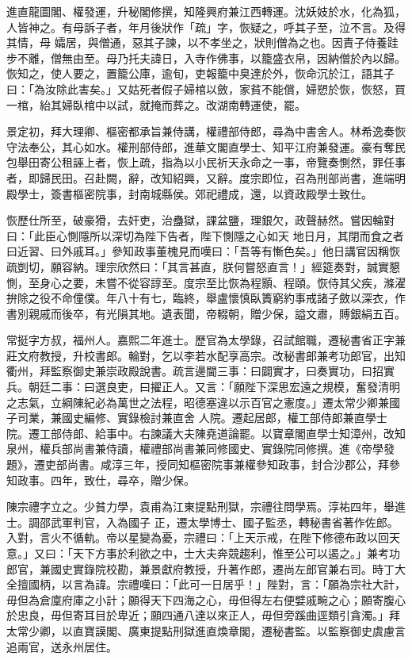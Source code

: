 \begin{pinyinscope}
 進直龍圖閣、權發運，升秘閣修撰，知隆興府兼江西轉運。沈妖妓於水，化為狐，人皆神之。有母訴子者，年月後狀作「疏」字，恢疑之，呼其子至，泣不言。及得其情，母
 孀居，與僧通，惡其子諫，以不孝坐之，狀則僧為之也。因責子侍養跬步不離，僧無由至。母乃托夫諱日，入寺作佛事，以籠盛衣帛，因納僧於內以歸。恢知之，使人要之，置籠公庫，逾旬，吏報籠中臭達於外，恢命沉於江，語其子曰：「為汝除此害矣。」又姑死者假子婦棺以斂，家貧不能償，婦愬於恢，恢怒，買一棺，紿其婦臥棺中以試，就掩而葬之。改湖南轉運使，罷。



 景定初，拜大理卿、樞密都承旨兼侍講，權禮部侍郎，尋為中書舍人。林希逸奏恢
 守法奉公，其心如水。權刑部侍郎，進華文閣直學士、知平江府兼發運。豪有奪民包舉田寄公租誣上者，恢上疏，指為以小民祈天永命之一事，帝覽奏惻然，罪任事者，即歸民田。召赴闕，辭，改知紹興，又辭。度宗即位，召為刑部尚書，進端明殿學士，簽書樞密院事，封南城縣侯。郊祀禮成，還，以資政殿學士致仕。



 恢歷仕所至，破豪猾，去奸吏，治蠱獄，課盆鹽，理銀欠，政聲赫然。嘗因輪對曰：「此臣心惻隱所以深切為陛下告者，陛下惻隱之心如天
 地日月，其閉而食之者曰近習、曰外戚耳。」參知政事董槐見而嘆曰：「吾等有慚色矣。」他日講官因稱恢疏剴切，願容納。理宗欣然曰：「其言甚直，朕何嘗怒直言！」經筵奏對，誠實懇惻，至身心之要，未嘗不從容諄至。度宗至比恢為程顥、程頤。恢侍其父疾，滌濯拚除之役不命僮僕。年八十有七，臨終，舉盧懷慎臥簀窮約事戒諸子斂以深衣，作書別親戚而後卒，有光隕其地。遺表聞，帝輟朝，贈少保，謚文肅，賻銀絹五百。



 常挺字方叔，福州人。嘉熙二年進士。歷官為太學錄，召試館職，遷秘書省正字兼莊文府教授，升校書郎。輪對，乞以李若水配享高宗。改秘書郎兼考功郎官，出知衢州，拜監察御史兼崇政殿說書。疏言邊閫三事：曰闢實才，曰奏實功，曰招實兵。朝廷二事：曰選良吏，曰擢正人。又言：「願陛下深思宏遠之規模，奮發清明之志氣，立綱陳紀必為萬世之法程，昭德塞違以示百官之憲度。」遷太常少卿兼國子司業，兼國史編修、實錄檢討兼直舍
 人院。遷起居郎，權工部侍郎兼直學士院。遷工部侍郎、給事中。右諫議大夫陳堯道論罷。以寶章閣直學士知漳州，改知泉州，權兵部尚書兼侍讀，權禮部尚書兼同修國史、實錄院同修撰。進《帝學發題》，遷吏部尚書。咸淳三年，授同知樞密院事兼權參知政事，封合沙郡公，拜參知政事。四年，致仕，尋卒，贈少保。



 陳宗禮字立之。少貧力學，袁甫為江東提點刑獄，宗禮往問學焉。淳祐四年，舉進士。調邵武軍判官，入為國子
 正，遷太學博士、國子監丞，轉秘書省著作佐郎。入對，言火不循軌。帝以星變為憂，宗禮曰：「上天示戒，在陛下修德布政以回天意。」又曰：「天下方事於利欲之中，士大夫奔競趨利，惟至公可以遏之。」兼考功郎官，兼國史實錄院校勘，兼景獻府教授，升著作郎，遷尚左郎官兼右司。時丁大全擅國柄，以言為諱。宗禮嘆曰：「此可一日居乎！」陛對，言：「願為宗社大計，毋但為倉廩府庫之小計；願得天下四海之心，毋但得左右便嬖戚畹之心；願寄腹心
 於忠良，毋但寄耳目於卑近；願四通八達以來正人，毋但旁蹊曲逕類引貪濁。」拜太常少卿，以直寶謨閣、廣東提點刑獄進直煥章閣，遷秘書監。以監察御史虞慮言追兩官，送永州居住。




\end{pinyinscope}
